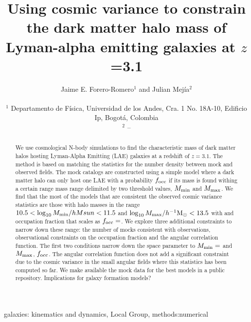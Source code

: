 \documentclass[usenatbib]{mn2e}
\newcommand{\hMsun}{{\ifmmode{h^{-1}{\rm {M_{\odot}}}}\else{$h^{-1}{\rm{M_{\odot}}}$}\fi}}
\begin{document}
\title[Dark Matter Halo Mass for LAEs  at $z=3.1$]{Using cosmic
  variance to constrain the dark matter halo mass of Lyman-alpha
  emitting galaxies at $z$=3.1} 
  
\author[~J.~E. Forero-Romero and J. Mejia]{
\parbox[t]{\textwidth}{\raggedright 
Jaime E. Forero-Romero$^{1}$ and
Julian Mej\'ia$^{2}$ 
}
\vspace*{6pt}\\
$^{1}$ Departamento de F\'{i}sica, Universidad de los Andes, Cra. 1
No. 18A-10, Edificio Ip, Bogot\'a, Colombia \\
$^{2}$ --}

\maketitle

\begin{abstract}
We use cosmological N-body simulations to find the characteristic mass
of dark matter halos hosting Lyman-Alpha Emitting (LAE) galaxies at a
redshift of $z=3.1$. The method is based on matching the statistics
for the number density between mock and observed fields. The mock
catalogs are constructed using a simple model where a dark matter halo
can only host one LAE with a probability $f_{\rm occ}$ if its mass is
found withing a certain range mass range delimited by two threshold
values, $M_{\rm min}$ and $M_{\rm max}$. We find that the most of the models that
are consistent the observed cosmic variance statistics are those with
halo masses in the range $10.5 < \log_{10} M_{\rm  min}/hMsun < 11.5$
and $\log_{10} M_{\rm max}/\hMsun < 13.5$ with and occupation fraction
that scales as $f_{\rm occ}=$. We explore three additional constraints
to narrow down these range: the number of mocks consistent with 
observations, observational constraints on the occupation fraction and
the angular correlation function. The first two conditions narrow down
the space parameter to $M_{\rm min}=$ and $M_{\rm max}$, $f_{\rm occ}$. The angular
correlation function does not add a significant constraint due to the
cosmic variance in the small angular fields where this statistics has
been computed so far. We make available the mock data for the best
models in a public repository. Implications for galaxy formation
models? 
\end{abstract}

\begin{keywords}
{galaxies: kinematics and dynamics, Local Group, methods:numerical}
\end{keywords}
\end{document}
